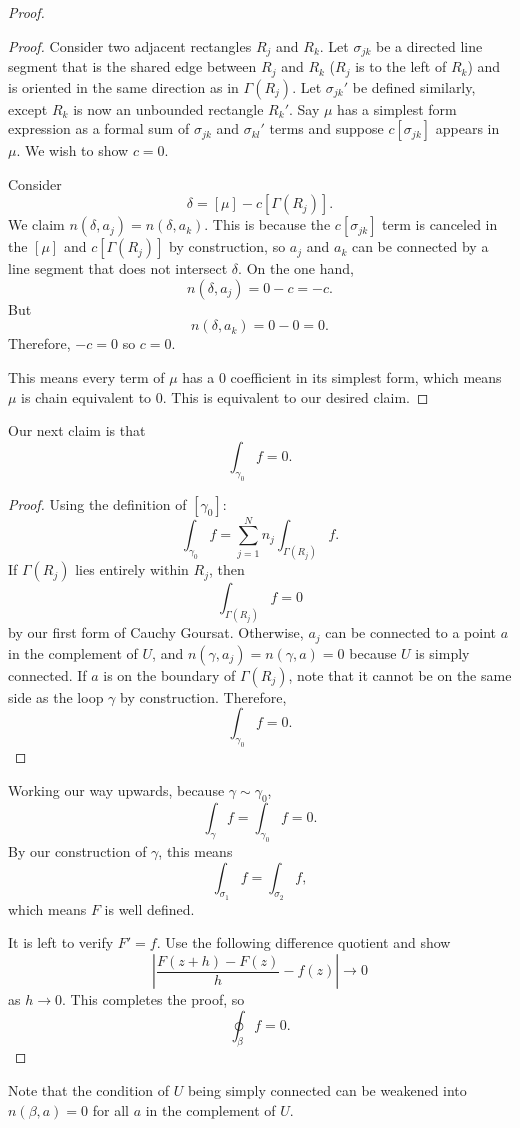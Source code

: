 \begin{proof}
\begin{proof}
        Consider two adjacent rectangles $R_j$ and $R_k$.
        Let $\sigma_{jk}$ be a directed line segment 
        that is the shared edge between $R_j$ and $R_k$
        ($R_j$ is to the left of $R_k$) and
        is oriented in the same direction as in $\Gamma(R_j)$.
        Let $\sigma_{jk}'$ be defined similarly, except
        $R_k$ is now an unbounded rectangle $R_k'$.
        Say $\mu$ has a simplest form expression as a formal
        sum of $\sigma_{jk}$ and $\sigma_{kl}'$ terms and
        suppose $c[\sigma_{jk}]$ appears in $\mu$.
        We wish to show $c=0$.
        
        Consider
        \[ \delta = [\mu] - c[\Gamma(R_j)]. \]
        We claim $n(\delta, a_j) = n(\delta, a_k)$.
        This is because the $c[\sigma_{jk}]$ term is canceled
        in the $[\mu]$ and $c[\Gamma(R_j)]$ by construction,
        so $a_j$ and $a_k$ can be connected by a line segment
        that does not intersect $\delta$.
        On the one hand, 
        \[ n(\delta, a_j) = 0 - c = -c. \]
        But
        \[ n(\delta, a_k) = 0 - 0 = 0. \]
        Therefore, $-c = 0$ so $c = 0$.

        This means every term of $\mu$ has a $0$ coefficient
        in its simplest form, which means $\mu$ is chain 
        equivalent to $0$.
        This is equivalent to our desired claim.
    \end{proof}
    Our next claim is that
    \[ \int_{\gamma_0} f = 0. \]
    \begin{proof}
        Using the definition of $[\gamma_0]$:
        \[ \int_{\gamma_0} f = \sum_{j=1}^N n_j \int_{\Gamma(R_j)}
        f. \]
        If $\Gamma(R_j)$ lies entirely within $R_j$, then
        \[ \int_{\Gamma(R_j)} f = 0 \]
        by our first form of Cauchy Goursat.
        Otherwise, $a_j$ can be connected to a point $a$
        in the complement of $U$, and $n(\gamma, a_j) = n(\gamma
        , a) = 0$ because $U$ is simply connected.
        If $a$ is on the boundary of $\Gamma(R_j)$, note that
        it cannot be on the same side as the loop $\gamma$
        by construction.
        Therefore,
        \[ \int_{\gamma_0} f = 0. \]
    \end{proof}
    Working our way upwards, because $\gamma \sim \gamma_0$,
    \[ \int_{\gamma} f = \int_{\gamma_0} f = 0. \]
    By our construction of $\gamma$, this means
    \[ \int_{\sigma_1} f = \int_{\sigma_2} f, \]
    which means $F$ is well defined.

    It is left to verify $F' = f$.
    Use the following difference quotient and show
    \[ \left| \frac{F(z+h)-F(z)}{h} - f(z) \right| \to 0 \]
    as $h \to 0$.
    This completes the proof, so
    \[ \oint_{\beta} f = 0. \]
\end{proof}

Note that the condition of $U$ being simply connected can
be weakened into $n(\beta, a) = 0$ for all $a$ in the complement
of $U$.

